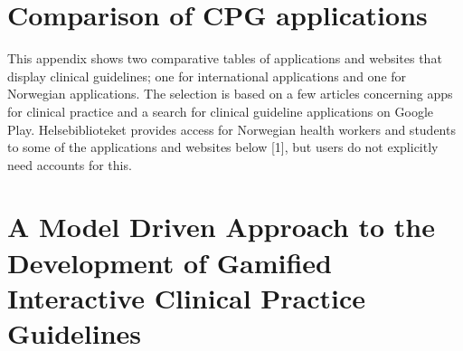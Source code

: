 \documentclass[a4paper,12pt,oneside]{book}
\begin{document}
\backmatter
\printbibliography


\appendix
\appendixpage
\addappheadtotoc
\chapter{Comparison of CPG applications}\label{appendix:ComparisonApps}
This appendix shows two comparative tables of applications and websites that display clinical guidelines; one for international applications and one for Norwegian applications. The selection is based on a few articles concerning apps for clinical practice and a search for clinical guideline applications on Google Play.
Helsebiblioteket provides access for Norwegian health workers and students to some of the applications and websites below [1], but users do not explicitly need accounts for this.


\chapter{A Model Driven Approach to the Development of Gamified Interactive Clinical
	Practice Guidelines}\label{appendix:Paper}

\end{document}
